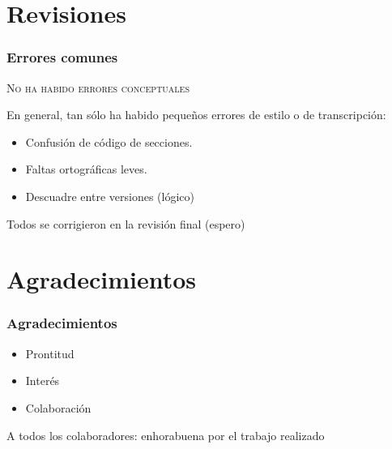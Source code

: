 \documentclass[9pt,xcolor=svgnames]{beamer}
\begin{document}
  
  \section{Revisiones}
  
  \begin{frame}
  \frametitle{Errores comunes}
    \transdissolve
    
  \textsc{No ha habido errores conceptuales}
  
  En general, tan sólo ha habido pequeños errores de estilo o de 
  transcripción:
  
  \begin{itemize}
  \item Confusión de código de secciones.
  \item Faltas ortográficas leves.
  \item Descuadre entre versiones (lógico)
  \end{itemize}
  
  Todos se corrigieron en la revisión final (espero)
  
  \end{frame}
  
  \section{Agradecimientos}
  
  \begin{frame}
  \frametitle{Agradecimientos}
    \transdissolve
    
  \begin{itemize}
  \item Prontitud
  \item Interés
  \item Colaboración
  \end{itemize}
  
  \vspace*{1cm}
  
  A todos los colaboradores: enhorabuena por el trabajo realizado

  \end{frame}
  
 
\end{document}

